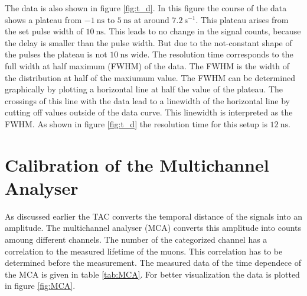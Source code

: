 The data is also shown in figure \ref{fig:t_d}. In this figure the course of the data shows a plateau from $\qty{-1}{\nano\second}$ to $\qty{5}{\nano\second}$ at around $\qty{7.2}{\second^{-1}}$.
This plateau arises from the set pulse width of $\qty{10}{\nano\second}$. This leads to no change in the signal counts, because the delay is smaller than the pulse width. But due 
to the not-constant shape of the pulses the plateau is not $\qty{10}{\nano\second}$ wide.
The resolution time corresponds to the full width at half maximum (FWHM) of the data. The FWHM is the width of the distribution at half of the maxiumum value.
The FWHM can be determined graphically by plotting a horizontal line at half the value of the plateau.
The crossings of this line with the data lead to a linewidth of the horizontal line by cutting off values outside of the data curve. This linewidth is interpreted as the FWHM.
As shown in figure \ref{fig:t_d} the resolution time for this setup is $\qty{12}{\nano\second}$. 

\section{Calibration of the Multichannel Analyser}
\label{sec:MCA}

As discussed earlier the TAC converts the temporal distance of the signals into an amplitude. The multichannel analyser (MCA) converts this amplitude into counts amoung different 
channels. The number of the categorized channel has a correlation to the measured lifetime of the muons. This correlation has to be determined before the measurement. The measured 
data of the time dependece of the MCA is given in table \ref{tab:MCA}. For better visualization the data is plotted in figure \ref{fig:MCA}. 

